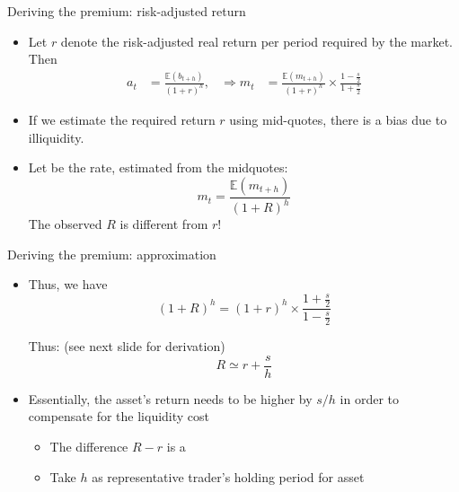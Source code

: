 \documentclass[english,10pt
,aspectratio=169
]{beamer}
\begin{document}
\begin{frame}{Deriving the premium: risk-adjusted return} \label{slide:Rr}
	\begin{itemize}
		\item Let \alert{$r$} denote the risk-adjusted \alert{real return} per period \alert{required by the market}. \hyperlink{slide:reqret}{} Then
		\begin{align*}
			a_t &= \frac{\mathbb{E}(b_{t+h})}{(1+r)^h},
			&
			\Rightarrow m_t &= \frac{\mathbb{E}(m_{t+h})}{(1+r)^h} \times \frac{1-\frac{s}{2}}{1+\frac{s}{2}}
		\end{align*}
		\pause
		\item If we estimate the required return $r$ using mid-quotes, there is a bias due to illiquidity. 
		\item Let  be the  rate, estimated from the midquotes:
		\[
			m_t = \frac{\mathbb{E}(m_{t+h})}{(1+R)^h}
		\]
		The observed $R$ is different from $r$!
	\end{itemize}
\end{frame}


\begin{frame}{Deriving the premium: approximation}
	\begin{itemize}
		\item Thus, we have
		\begin{equation}\tag{9.5}
		(1+R)^h = (1+r)^h \times \frac{1+\frac{s}{2}}{1-\frac{s}{2}}
		\end{equation}
		\begin{block}{}
			Thus: (see next slide for derivation)
			\[
			R \simeq r+\frac{s}{h}
			\]
		\end{block}
		\item Essentially, the asset's return needs to be higher by $s/h$ in order to compensate for the liquidity cost
		\begin{itemize}
			\item The difference $R-r$ is a 
			\item Take $h$ as representative trader's holding period for asset
		\end{itemize}
	\end{itemize}
\end{frame}
\end{document}
